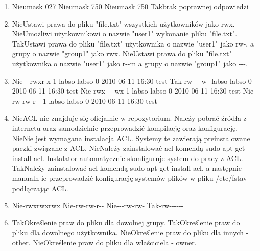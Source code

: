 \begin{enumerate}
	\item {}
	{Nie}{umask 027}
	{Nie}{umask 750}
	{Nie}{umask 750}
	{Tak}{brak poprawnej odpowiedzi}
	
	\item {}
	{Nie}{Ustawi prawa do pliku "file.txt" wszystkich użytkowników jako rwx.}
	{Nie}{Umożliwi użytkownikowi o nazwie "user1" wykonanie pliku "file.txt".}
	{Tak}{Ustawi prawa do pliku "file.txt" użytkownika o nazwie "user1" jako rw-, a grupy o nazwie "group1" jako rwx.}
	{Nie}{Ustawi prawa do pliku "file.txt" użytkownika o nazwie "user1" jako r-{}-m a grupy o nazwie "group1" jako -{}-{}-.}
	
	\item {}
	{Nie}{-{}-{}-rwxr-x 1 labso labso 0 2010-06-11 16:30 test}
	{Tak}{-rw-{}-{}-{}-w- labso labso 0 2010-06-11 16:30 test}
	{Nie}{-rwx-{}-{}-{}-wx 1 labso labso 0 2010-06-11 16:30 test}
	{Nie}{-rw-rw-r-{}- 1 labso labso 0 2010-06-11 16:30 test}
	
	\newpage
	
	\item {}
	{Nie}{ACL nie znajduje się oficjalnie w repozytorium. Należy pobrać źródła z internetu oraz samodzielnie przeprowadzić kompilację oraz konfigurację.}
	{Nie}{Nie jest wymagana instalacja ACL. Systemy te zawierają preinstalowane paczki związane z ACL.}
	{Nie}{Należy zainstalować acl komendą sudo apt-get install acl. Instalator automatycznie skonfiguruje system do pracy z ACL.}
	{Tak}{Należy zainstalować acl komendą sudo apt-get install acl, a następnie manualn ie przeprowadzić konfigurację systemów plików w pliku /etc/fstav podłączając ACL.}
	
	\item {}
	{Nie}{-rwxrwxrwx}
	{Nie}{-rw-rw-r-{}-}
	{Nie}{-{}-{}-rw-rw-}
	{Tak}{-rw-{}-{}-{}-{}-{}-}
	
	\item {}
	{Tak}{Określenie praw do pliku dla dowolnej grupy.}
	{Tak}{Określenie praw do pliku dla dowolnego użytkownika.}
	{Nie}{Określenie praw do pliku dla innych - other.}
	{Nie}{Określenie praw do pliku dla właściciela - owner.}
	

\end{enumerate}
